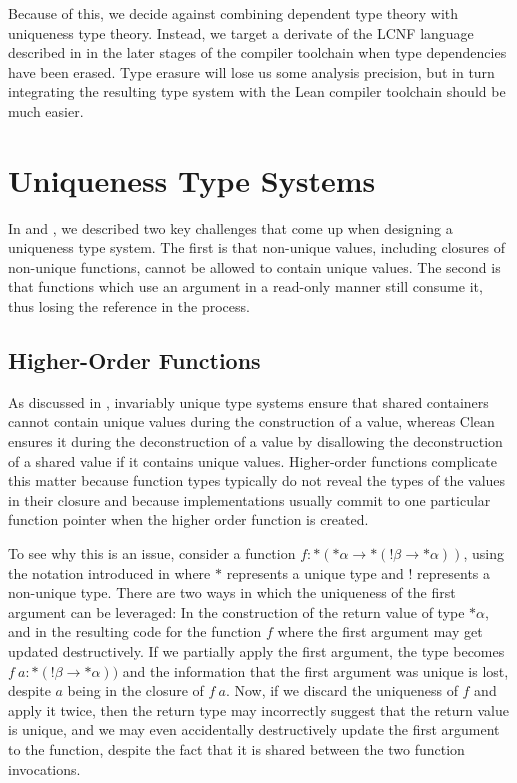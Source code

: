 Because of this, we decide against combining dependent type theory with uniqueness type theory. Instead, we target a derivate of the LCNF language described in  in the later stages of the compiler toolchain when type dependencies have been erased. Type erasure will lose us some analysis precision, but in turn integrating the resulting type system with the Lean compiler toolchain should be much easier.

\section{Uniqueness Type Systems}
In  and , we described two key challenges that come up when designing a uniqueness type system. The first is that non-unique values, including closures of non-unique functions, cannot be allowed to contain unique values. The second is that functions which use an argument in a read-only manner still consume it, thus losing the reference in the process.

\subsection{Higher-Order Functions}\label{sec:hof}
As discussed in , invariably unique type systems ensure that shared containers cannot contain unique values during the construction of a value, whereas Clean ensures it during the deconstruction of a value by disallowing the deconstruction of a shared value if it contains unique values. Higher-order functions complicate this matter because function types typically do not reveal the types of the values in their closure and because implementations usually commit to one particular function pointer when the higher order function is created. 

To see why this is an issue, consider a function $f : *(*\alpha \to *(!\beta \to *\alpha))$, using the notation introduced in  where $*$ represents a unique type and $!$ represents a non-unique type. There are two ways in which the uniqueness of the first argument can be leveraged: In the construction of the return value of type $*\alpha$, and in the resulting code for the function $f$ where the first argument may get updated destructively. If we partially apply the first argument, the type becomes $f\ a : *(!\beta \to *\alpha))$ and the information that the first argument was unique is lost, despite $a$ being in the closure of $f\ a$. Now, if we discard the uniqueness of $f$ and apply it twice, then the return type may incorrectly suggest that the return value is unique, and we may even accidentally destructively update the first argument to the function, despite the fact that it is shared between the two function invocations.

